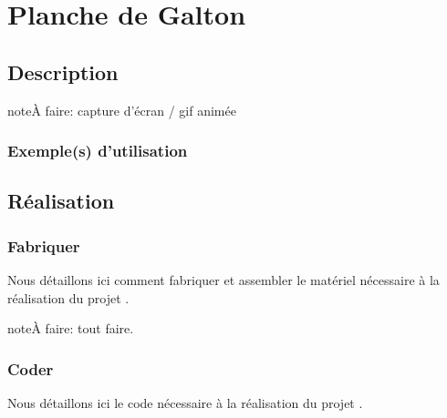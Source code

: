 \documentclass[letterpaper,10pt,french]{sphinxmanual}
\begin{document}


\section{Planche de Galton}
\label{\detokenize{projets/galton:planche-de-galton}}\label{\detokenize{projets/galton::doc}}\label{\detokenize{projets/galton:projetgalton}}

\subsection{Description}
\label{\detokenize{projets/galton:description}}
\begin{sphinxadmonition}{note}{\label{projets/galton:index-0}À faire:}
capture d’écran / gif animée
\end{sphinxadmonition}


\subsubsection{Exemple(s) d’utilisation}
\label{\detokenize{projets/galton:exemple-s-d-utilisation}}

\subsection{Réalisation}
\label{\detokenize{projets/galton:realisation}}

\subsubsection{Fabriquer}
\label{\detokenize{projets/galton-fabriquer::doc}}\label{\detokenize{projets/galton-fabriquer:fabriquer}}
Nous détaillons ici comment fabriquer et assembler
le matériel nécessaire à la réalisation du projet
{\hyperref[\detokenize{projets/galton:projetgalton}]{}}.

\begin{sphinxadmonition}{note}{\label{projets/galton-fabriquer:index-0}À faire:}
tout faire.
\end{sphinxadmonition}


\subsubsection{Coder}
\label{\detokenize{projets/galton-coder:coder}}\label{\detokenize{projets/galton-coder::doc}}
\ignorespaces 
Nous détaillons ici le code nécessaire à la réalisation
du projet {\hyperref[\detokenize{projets/galton:projetgalton}]{}}.
\end{document}

